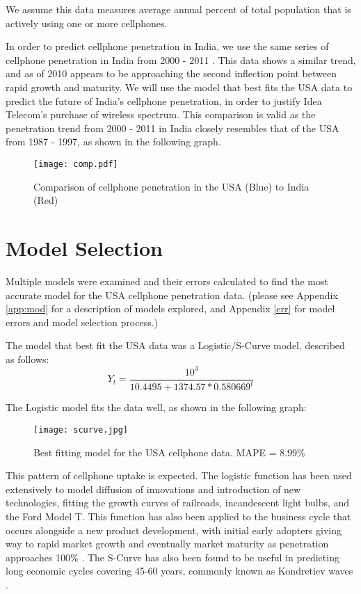 \documentclass[11pt]{article}
\begin{document}
		We assume this data measures average annual percent of total population that is actively using one or more cellphones.

\newpage


		In order to predict cellphone penetration in India, we use the same series of cellphone penetration in India from 2000 - 2011 \cite{InternationalTelecomm}.
		This data shows a similar trend, and as of 2010 appears to be approaching the second inflection point between rapid growth and maturity.
		We will use the model that best fits the USA data to predict the future of India's cellphone penetration, in order to justify Idea Telecom's  purchase of wireless spectrum.
		This comparison is valid as the penetration trend from 2000 - 2011 in India closely resembles that of the USA from 1987 - 1997, as shown in the following graph.
		\begin{figure}[h!]
			\centering
			\texttt{[image: comp.pdf]}
			\caption{Comparison of cellphone penetration in the USA (Blue) to India (Red)}
			\label{fig:comp}
		\end{figure}


\newpage
	\section{Model Selection}
	Multiple models were examined and their errors calculated to find the most accurate model for the USA cellphone penetration data. (please see Appendix \ref{app:mod} for a description of models explored, and Appendix \ref{err} for model errors and model selection process.)


		The model that best fit the USA data was a Logistic/S-Curve model, described as follows:
		\begin{equation}
			Y_t = \frac{10^3}{10.4495 + 1374.57 * 0.580669^t}
				\label{scurve}
		\end{equation}

		The Logistic model fits the data well, as shown in the following graph:
		\begin{figure}[h!]
			\centering
			\texttt{[image: scurve.jpg]}
			\caption{Best fitting model for the USA cellphone data. MAPE = 8.99\%}
			\label{fig:fitmod}
		\end{figure}


		This pattern of cellphone uptake is expected. 
		The logistic function has been used extensively to model diffusion of innovations and introduction of new technologies, fitting the growth curves of railroads, incandescent light bulbs, and the Ford Model T.
		This function has also been applied to the business cycle that occurs alongside a new product development, with initial early adopters giving way to rapid market growth and eventually market maturity as penetration approaches 100\% \cite{perez2002technological}.
		The S-Curve has also been found to be useful in predicting long economic cycles covering 45-60 years, commonly known as Kondretiev waves \cite{Marchetti1996}.
\newpage
\end{document}
